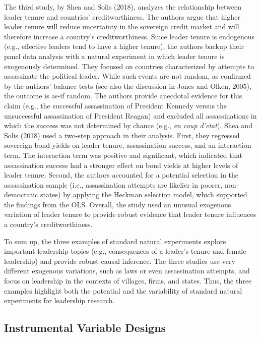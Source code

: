 \documentclass[english]{article}
\begin{document}
The third study, by Shea and Solis (2018), analyzes the relationship
between leader tenure and countries' creditworthiness. The authors argue
that higher leader tenure will reduce uncertainty in the sovereign
credit market and will therefore increase a country's creditworthiness.
Since leader tenure is endogenous (e.g., effective leaders tend to have
a higher tenure), the authors backup their panel data analysis with a
natural experiment in which leader tenure is exogenously determined.
They focused on countries characterized by attempts to assassinate the
political leader. While such events are not random, as confirmed by the
authors' balance tests (see also the discussion in Jones and Olken,
2005), the outcome is as-if random. The authors provide anecdotal
evidence for this claim (e.g., the successful assassination of President
Kennedy versus the unsuccessful assassination of President Reagan) and
excluded all assassinations in which the success was not determined by
chance (e.g., \emph{en coup d'etat}). Shea and Solis (2018) used a
two-step approach in their analysis. First, they regressed sovereign
bond yields on leader tenure, assassination success, and an interaction
term. The interaction term was positive and significant, which indicated
that assassination success had a stronger effect on bond yields at
higher levels of leader tenure. Second, the authors accounted for a
potential selection in the assassination sample (i.e., assassination
attempts are likelier in poorer, non-democratic states) by applying the
Heckman selection model, which supported the findings from the OLS.
Overall, the study used an unusual exogenous variation of leader tenure
to provide robust evidence that leader tenure influences a country's
creditworthiness.

To sum up, the three examples of standard natural experiments explore
important leadership topics (e.g., consequences of a leader's tenure and
female leadership) and provide robust causal inference. The three
studies use very different exogenous variations, such as laws or even
assassination attempts, and focus on leadership in the contexts of
villages, firms, and states. Thus, the three examples highlight both the
potential and the variability of standard natural experiments for
leadership research.


\subsection{Instrumental Variable Designs} 
\end{document}

